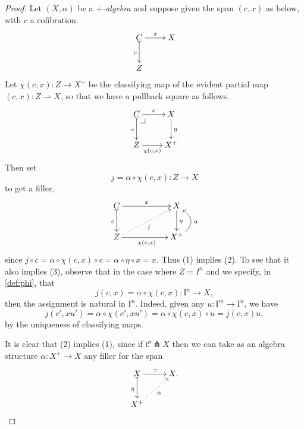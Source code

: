 \documentclass[12pt]{article}
\makeatletter
\newcommand{\pbcorner}[1][dr]{\save*!/#1-1.2pc/#1:(-1,1)@^{|-}\restore}
\newcommand{\ra}{\ensuremath{\rightarrow}}
\newcommand{\I}{\ensuremath{\mathrm{I}}}
\theoremstyle{remark}
\theoremstyle{definition}
\makeatother
\begin{document}
\begin{proof}
Let $(X, \alpha)$ be a \emph{$+$-algebra} and suppose given the span $(c,x)$ as below, with $c$ a cofibration. 
\begin{equation*}%
\xymatrix{
C \ar@{>->}[d]_{c} \ar[r]^{x} & X \\
Z &
}
\end{equation*}
Let $\chi(c,x): Z\ra X^+$ be the classifying map of the evident partial map $(c,x) : Z\rightharpoonup X$, so that we have a pullback square as follows.
\begin{equation}\label{diagram:defphi}
\xymatrix{
C \ar@{>->}[d]_{c} \ar[r]^{x} \pbcorner & X \ar[d]^{\eta} \\
Z \ar[r]_-{\chi(c,x)} & X^+
}
\end{equation}
Then set
\begin{equation}\label{def:phi}
j = \alpha\circ\chi(c,x) : Z\ra X
\end{equation}
to get a filler,
\begin{equation}\label{diagram:defphi}
\xymatrix{
C \ar@{>->}[d]_{c} \ar[rr]^{x} && X \ar[d]^{\eta} \\
Z\ar@{.>}[rru]_{j} \ar[rr]_{\chi(c,x)} && X^+  \ar@/_4ex/ [u]_\alpha
}
\end{equation}
since $j\circ c = \alpha\circ\chi(c,x)\circ c = \alpha\circ\eta \circ x = x$. Thus (1) implies (2).  To see that it also implies (3), observe that in the case where $Z=I^n$ and we specify, in \eqref{def:phi}, that
\begin{equation}\label{def:j}
j(c,x) = \alpha\circ\chi(c,x) : \I^n\ra X,
\end{equation}
then the assignment is natural in $\I^n$. Indeed,  given any $u : \I^m \ra \I^n$, we have
\begin{equation}\label{eq:proof,uniformfillers}
j(c',xu') = \alpha\circ\chi(c',xu') = \alpha\circ\chi(c,x)\circ u = j(c,x) u,
\end{equation}
by the uniqueness of classifying maps.

It is clear that (2) implies (1), since if $\mathcal{C} \pitchfork X$ then we can take as an algebra structure $\alpha : X^+ \ra X$ any filler for the span
\[
\xymatrix{
X \ar@{>->}[d]_{\eta} \ar[r]^{=} & X .\\
X^+ \ar@{.>}[ru]_\alpha&
}
\]


\end{proof}
\end{document}
